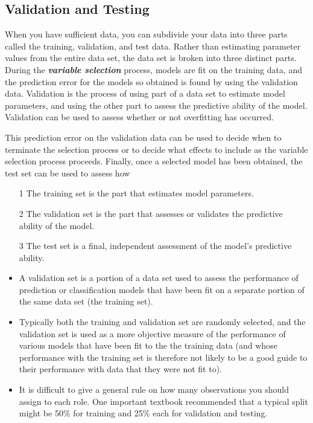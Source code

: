 \documentclass[a4paper,12pt]{article}
\begin{document}
\subsection{Validation and Testing}
When you have sufficient data, you can subdivide your data into three parts called the training, validation, and test data. Rather than estimating parameter values from the entire data set, the data set is broken into three distinct parts. During the \textbf{\textit{variable selection}} process, models are fit on the training data, and the prediction error for the models so obtained is found by using the validation data. Validation is the process of using part of a data set to estimate model parameters, and using the other part to assess the predictive ability of the model. Validation can be used to assess whether or not overfitting has occurred.

This prediction error on the validation data can be used to decide when to terminate the selection process or to decide what effects to include as the variable selection process proceeds. Finally, once a selected model has been obtained, the test set can be used to assess how 


\begin{framed}
	\begin{itemize}
		\item[1] The training set is the part that estimates model parameters.
		\item[2] The validation set is the part that assesses or validates the predictive ability of the model.
		\item[3] The test set is a final, independent assessment of the model's predictive ability.
	\end{itemize}
\end{framed}
\begin{itemize}
	\item A validation set is a portion of a data set used to assess the performance of prediction or classification models that have been fit on a separate portion of the same data set (the training set). 
	\item Typically both the training and validation set are randomly selected, and the validation set is used as a more objective measure of the performance of various models that have been fit to the the training data (and whose performance with the training set is therefore not
	likely to be a good guide to their performance with data that they were not fit to).
	
	\item It is difficult to give a general rule on how many observations you should assign to each role. One important textbook recommended that a typical split might be 50\% for training and 25\% each for validation and testing.
	
\end{itemize}
\end{document}
